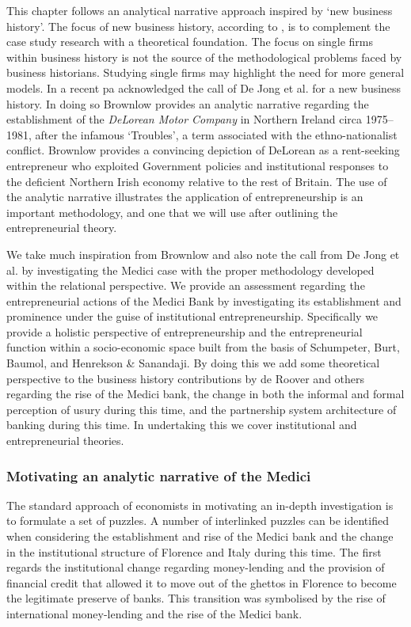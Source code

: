This chapter follows an analytical narrative approach inspired by `new business history'. The focus of new business history, according to \citet{JongHigginsDriel2015}, is to complement the case study research with a theoretical foundation. The focus on single firms within business history is not the source of the methodological problems faced by business historians. Studying single firms may highlight the need for more general models. In a recent pa\citet{Brownlow2015} acknowledged the call of De Jong et al. for a new business history. In doing so Brownlow provides an analytic narrative regarding the establishment of the \emph{DeLorean Motor Company} in Northern Ireland circa 1975--1981, after the infamous `Troubles', a term associated with the ethno-nationalist conflict. Brownlow provides a convincing depiction of DeLorean as a rent-seeking entrepreneur who exploited Government policies and institutional responses to the deficient Northern Irish economy relative to the rest of Britain. The use of the analytic narrative illustrates the application of entrepreneurship is an important methodology, and one that we will use after outlining the entrepreneurial theory.

We take much inspiration from Brownlow and also note the call from De Jong et al. by investigating the Medici case with the proper methodology developed within the relational perspective. We provide an assessment regarding the entrepreneurial actions of the Medici Bank by investigating its establishment and prominence under the guise of institutional entrepreneurship. Specifically we provide a holistic perspective of entrepreneurship and the entrepreneurial function within a socio-economic space built from the basis of Schumpeter, Burt, Baumol, and Henrekson \& Sanandaji. By doing this we add some theoretical perspective to the business history contributions by de Roover and others regarding the rise of the Medici bank, the change in both the informal and formal perception of usury during this time, and the partnership system architecture of banking during this time. In undertaking this we cover institutional and entrepreneurial theories.

\subsubsection{Motivating an analytic narrative of the Medici}

The standard approach of economists in motivating an in-depth investigation is to formulate a set of puzzles. A number of interlinked puzzles can be identified when considering the establishment and rise of the Medici bank and the change in the institutional structure of Florence and Italy during this time. The first regards the institutional change regarding money-lending and the provision of financial credit that allowed it to move out of the ghettos in Florence to become the legitimate preserve of banks. This transition was symbolised by the rise of international money-lending and the rise of the Medici bank.

